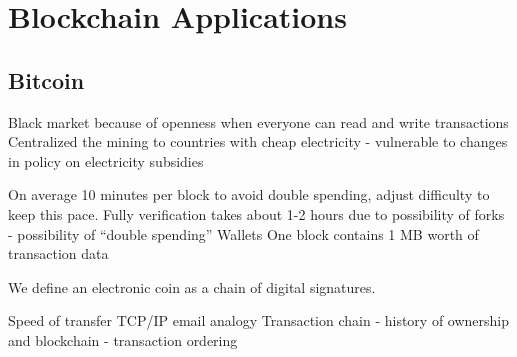 \section{Blockchain Applications}
\subsection{Bitcoin}
Black market because of openness when everyone can read and write transactions
Centralized the mining to countries with cheap electricity - vulnerable to changes in policy on electricity subsidies %

On average 10 minutes per block to avoid double spending, adjust difficulty to keep this pace. Fully verification takes about 1-2 hours due to possibility of forks - possibility of \enquote{double spending}
Wallets
One block contains 1 MB worth of transaction data

We define an electronic coin as a chain of digital signatures. 

Speed of transfer
TCP/IP email analogy
Transaction chain - history of ownership and blockchain - transaction ordering



